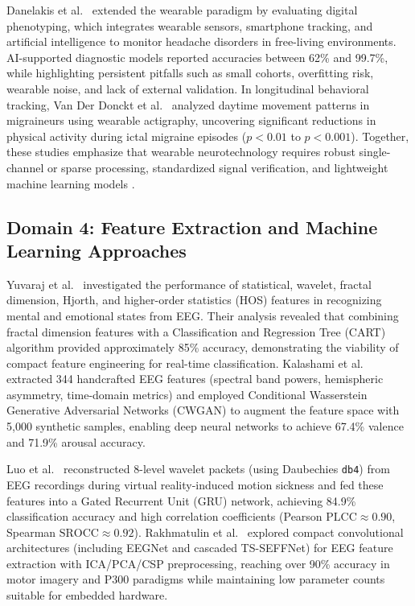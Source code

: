 \documentclass[12pt, a4paper]{report}
\begin{document}
Danelakis et al.~\cite{DanelakisStubberud2025} extended the wearable paradigm by evaluating digital phenotyping, which integrates wearable sensors, smartphone tracking, and artificial intelligence to monitor headache disorders in free-living environments. AI-supported diagnostic models reported accuracies between 62\% and 99.7\%, while highlighting persistent pitfalls such as small cohorts, overfitting risk, wearable noise, and lack of external validation. In longitudinal behavioral tracking, Van Der Donckt et al.~\cite{VanDerDonckt2025} analyzed daytime movement patterns in migraineurs using wearable actigraphy, uncovering significant reductions in physical activity during ictal migraine episodes ($p < 0.01$ to $p < 0.001$). Together, these studies emphasize that wearable neurotechnology requires robust single-channel or sparse processing, standardized signal verification, and lightweight machine learning models \cite{Petrusic2025,He2023,DanelakisStubberud2025}.

\subsection{Domain 4: Feature Extraction and Machine Learning Approaches}
\label{subsec:lit_feature_extraction}
Yuvaraj et al.~\cite{Yuvaraj2023} investigated the performance of statistical, wavelet, fractal dimension, Hjorth, and higher-order statistics (HOS) features in recognizing mental and emotional states from EEG. Their analysis revealed that combining fractal dimension features with a Classification and Regression Tree (CART) algorithm provided approximately 85\% accuracy, demonstrating the viability of compact feature engineering for real-time classification. Kalashami et al.~\cite{Kalashami2022} extracted 344 handcrafted EEG features (spectral band powers, hemispheric asymmetry, time-domain metrics) and employed Conditional Wasserstein Generative Adversarial Networks (CWGAN) to augment the feature space with 5{,}000 synthetic samples, enabling deep neural networks to achieve 67.4\% valence and 71.9\% arousal accuracy.

Luo et al.~\cite{Luo2024} reconstructed 8-level wavelet packets (using Daubechies \texttt{db4}) from EEG recordings during virtual reality-induced motion sickness and fed these features into a Gated Recurrent Unit (GRU) network, achieving 84.9\% classification accuracy and high correlation coefficients (Pearson $\text{PLCC} \approx 0.90$, Spearman $\text{SROCC} \approx 0.92$). Rakhmatulin et al.~\cite{Rakhmatulin2024} explored compact convolutional architectures (including EEGNet and cascaded TS-SEFFNet) for EEG feature extraction with ICA/PCA/CSP preprocessing, reaching over 90\% accuracy in motor imagery and P300 paradigms while maintaining low parameter counts suitable for embedded hardware.
\end{document}
